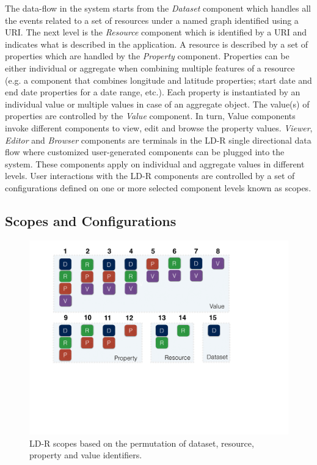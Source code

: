 \documentclass{acm_proc_article-sp}
\begin{document}
The data-flow in the system starts from the \emph{Dataset} component which handles all the events related to a set of resources under a named graph identified using a URI.
The next level is the \emph{Resource} component which is identified by a URI and indicates what is described in the application.
A resource is described by a set of properties which are handled by the \emph{Property} component. 
Properties can be either individual or aggregate when combining multiple features of a resource (e.g. a component that combines longitude and latitude properties; start date and end date properties for a date range, etc.).
Each property is instantiated by an individual value or multiple values in case of an aggregate object. 
The value(s) of properties are controlled by the \emph{Value} component.
In turn, Value components invoke different components to view, edit and browse the property values.
\emph{Viewer}, \emph{Editor} and \emph{Browser} components are terminals in the LD-R single directional data flow where customized user-generated components can be plugged into the system.
These components apply on individual and aggregate values in different levels.
User interactions with the LD-R components are controlled by a set of configurations defined on one or more selected component levels known as scopes.

\subsection{Scopes and Configurations}

\begin{figure}[tb]
  \includegraphics[width=.95\linewidth]{images/scopes.pdf}
  \caption{LD-R scopes based on the permutation of dataset, resource, property and value identifiers.}
  \label{fig:scopes}
\end{figure}
\end{document}
